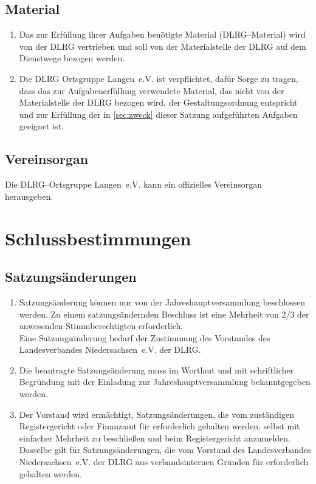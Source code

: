 \documentclass[%
12pt, %
a4paper, %
headsepline, %
parskip, %
headings=normal, %
]{scrreprt}
\begin{document}
\section{Material}
\label{sec:material}
\begin{enumerate}
    \item Das zur Erfüllung ihrer Aufgaben benötigte Material (DLRG--Material) wird von der DLRG vertrieben und soll von der Materialstelle der DLRG auf dem Dienstwege bezogen werden.
    \item Die DLRG Ortsgruppe Langen~e.V. ist verpflichtet, dafür Sorge zu tragen, dass das zur Aufgabenerfüllung verwendete Material, das nicht von der Materialstelle der DLRG bezogen wird, der Gestaltungsordnung entspricht und zur Erfüllung der in \ref{sec:zweck} dieser Satzung aufgeführten Aufgaben geeignet ist.
\end{enumerate}

\section{Vereinsorgan}
\label{sec:vereinsorgan}
Die DLRG--Ortsgruppe Langen~e.V. kann ein offizielles Vereinsorgan herausgeben.

\chapter{Schlussbestimmungen}
\setcounter{section}{12}
\section{Satzungsänderungen}
\label{sec:satzungsaenderungen}
\begin{enumerate}
    \item Satzungsänderung können nur von der Jahreshauptversammlung beschlossen werden. Zu einem satzungsändernden Beschluss ist eine Mehrheit von 2/3 der anwesenden Stimmberechtigten erforderlich.\\
      Eine Satzungsänderung bedarf der Zustimmung des Vorstandes des Landesverbandes Niedersachsen~e.V. der DLRG.
    \item Die beantragte Satzungsänderung muss im Wortlaut und mit schriftlicher Begründung mit der Einladung zur Jahreshauptversammlung bekanntgegeben werden.
    \item Der Vorstand wird ermächtigt, Satzungsänderungen, die vom zuständigen Registergericht oder Finanzamt für erforderlich gehalten werden, selbst mit einfacher Mehrheit zu beschließen und beim Registergericht anzumelden. Dasselbe gilt für Satzungsänderungen, die vom Vorstand des Landesverbandes Niedersachsen~e.V. der DLRG aus verbandsinternen Gründen für erforderlich gehalten werden.
\end{enumerate}
\end{document}
